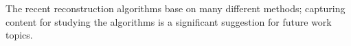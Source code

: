 The recent reconstruction algorithms base on many different methods; capturing content for studying the algorithms is a significant suggestion for future work topics.

